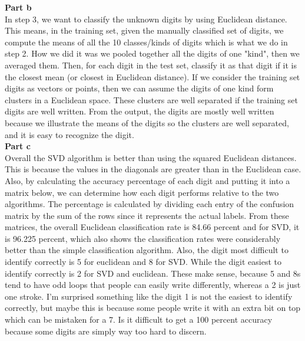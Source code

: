 \documentclass{article}
\begin{document}
\bigskip
\textbf{Part b} \\ 
In step 3, we want to classify the unknown digits by using Euclidean distance. This means, in the training set, given the manually classified set of digits, we compute the means of all the 10 classes/kinds of digits which is what we do in step 2. How we did it was we pooled together all the digits of one "kind", then we averaged them. Then, for each digit in the test set, classify it as that digit if it is the closest mean (or closest in Euclidean distance). If we consider the training set digits as vectors or points, then we can assume the digits of one kind form clusters in a Euclidean space. These clusters are well separated if the training set digits are well written. From the output, the digits are mostly well written because we illustrate the means of the digits so the clusters are well separated, and it is easy to recognize the digit. \\

\bigskip
\textbf{Part c} \\
Overall the SVD algorithm is better than using the squared Euclidean distances. This is because the values in the diagonals are greater than in the Euclidean case. Also, by calculating the accuracy percentage of each digit and putting it into a matrix below, we can determine how each digit performs relative to the two algorithms. The percentage is calculated by dividing each entry of the confusion matrix by the sum of the rows since it represents the actual labels. From these matrices, the overall Euclidean classification rate is 84.66 percent and for SVD, it is 96.225 percent, which also shows the classification rates were considerably better than the simple classification algorithm. 	Also, the digit most difficult to identify correctly is 5 for euclidean and 8 for SVD. While the digit easiest to identify correctly is 2 for SVD and euclidean. These make sense, because 5 and 8s tend to have odd loops that people can easily write differently, whereas a 2 is just one stroke. I'm surprised something like the digit 1 is not the easiest to identify correctly, but maybe this is because some people write it with an extra bit on top which can be mistaken for a 7. Is it difficult to get a 100 percent accuracy because some digits are simply way too hard to discern.  \\
\end{document}
